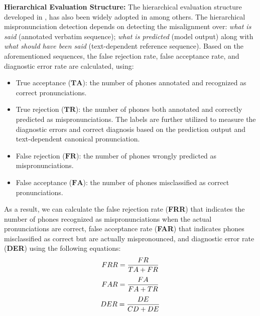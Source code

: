 \documentclass[11pt]{article}
\begin{document}
\noindent \textbf{Hierarchical Evaluation Structure:} The hierarchical evaluation structure developed in \cite{qian2010capturing}, has also been widely adopted in \cite{wang2015supervised, li2016mispronunciation, kheir2023multi} among others.
The hierarchical mispronunciation detection depends on detecting the misalignment over: \textit{what is said} (annotated verbatim sequence); \textit{what is predicted} (model output) along with \textit{what should have been said} (text-dependent reference sequence). 
Based on the aforementioned sequences, the false rejection rate, false acceptance rate, and diagnostic error rate are calculated, using:

\begin{itemize}[leftmargin=*]
    \item True acceptance ($\textbf{TA}$): the number of phones annotated and recognized as correct pronunciations.
    \item True rejection ($\textbf{TR}$): the number of phones both annotated and correctly predicted as mispronunciations. The labels are further utilized to measure the diagnostic errors and correct diagnosis based on the prediction output and text-dependent canonical pronunciation.
    \item False rejection ($\textbf{FR}$): the number of phones wrongly predicted as mispronunciations.
    \item False acceptance ($\textbf{FA}$): the number of phones misclassified as correct pronunciations.
\end{itemize}

\noindent As a result, we can calculate the false rejection rate (\textbf{FRR}) that indicates the number of phones recognized as mispronunciations when the actual pronunciations are correct, false acceptance rate (\textbf{FAR}) that indicates phones misclassified as correct but are actually mispronounced, and diagnostic error rate (\textbf{DER}) using the following equations:
\begin{equation}
\small
FRR = \frac{FR}{TA + FR}
\vspace{-0.1cm}
\end{equation}
\begin{equation}
\small
FAR = \frac{FA}{FA + TR}
\vspace{-0.1cm}
\end{equation}
\begin{equation}
\small
DER = \frac{DE}{CD + DE}
\end{equation}
\end{document}
